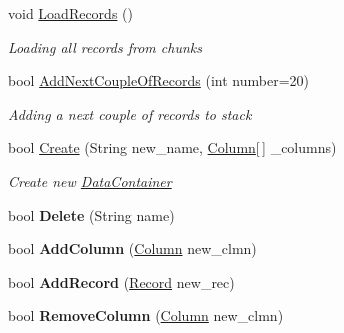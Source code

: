 \begin{DoxyCompactItemize}
\item 
void \hyperlink{class_dwarf_d_b_1_1_data_structures_1_1_data_container_aa5a712b9a8923f2d57278b58d46d6927}{Load\+Records} ()
\begin{DoxyCompactList}\small\item\em Loading all records from chunks \end{DoxyCompactList}\item 
bool \hyperlink{class_dwarf_d_b_1_1_data_structures_1_1_data_container_ac2f044ee93ae6a4ba25b0deb9333867e}{Add\+Next\+Couple\+Of\+Records} (int number=20)
\begin{DoxyCompactList}\small\item\em Adding a next couple of records to stack \end{DoxyCompactList}\item 
bool \hyperlink{class_dwarf_d_b_1_1_data_structures_1_1_data_container_accdc07066ac67d50fe891f8768e734b9}{Create} (String new\+\_\+name, \hyperlink{class_dwarf_d_b_1_1_data_structures_1_1_column}{Column}\mbox{[}$\,$\mbox{]} \+\_\+columns)
\begin{DoxyCompactList}\small\item\em Create new \hyperlink{class_dwarf_d_b_1_1_data_structures_1_1_data_container}{Data\+Container} \end{DoxyCompactList}\item 
\hypertarget{class_dwarf_d_b_1_1_data_structures_1_1_data_container_acee585ee5f3d45fe8474a03d533e9119}{bool {\bfseries Delete} (String name)}\label{class_dwarf_d_b_1_1_data_structures_1_1_data_container_acee585ee5f3d45fe8474a03d533e9119}

\item 
\hypertarget{class_dwarf_d_b_1_1_data_structures_1_1_data_container_a8e38284dde8d76439d691723da7f80fb}{bool {\bfseries Add\+Column} (\hyperlink{class_dwarf_d_b_1_1_data_structures_1_1_column}{Column} new\+\_\+clmn)}\label{class_dwarf_d_b_1_1_data_structures_1_1_data_container_a8e38284dde8d76439d691723da7f80fb}

\item 
\hypertarget{class_dwarf_d_b_1_1_data_structures_1_1_data_container_a74ffad7564db689751c64501d644026a}{bool {\bfseries Add\+Record} (\hyperlink{class_dwarf_d_b_1_1_data_structures_1_1_record}{Record} new\+\_\+rec)}\label{class_dwarf_d_b_1_1_data_structures_1_1_data_container_a74ffad7564db689751c64501d644026a}

\item 
\hypertarget{class_dwarf_d_b_1_1_data_structures_1_1_data_container_ae1018ff6ba68ea2ae75dadcc383eb1f2}{bool {\bfseries Remove\+Column} (\hyperlink{class_dwarf_d_b_1_1_data_structures_1_1_column}{Column} new\+\_\+clmn)}\label{class_dwarf_d_b_1_1_data_structures_1_1_data_container_ae1018ff6ba68ea2ae75dadcc383eb1f2}


\end{DoxyCompactItemize}

